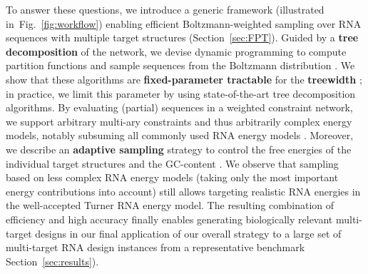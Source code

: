 \documentclass{bioinfo}
\newcommand{\Def}[1]{{\bfseries #1}}
\newcommand{\Nuc}[1]{{\sf #1}}
\newcommand{\Cb}{\Nuc{C}}
\newcommand{\Gb}{\Nuc{G}}
\newcommand{\GCb}{\Gb\Cb}
\begin{document}
To answer these questions, we introduce a generic framework (illustrated in~Fig.~\ref{fig:workflow}) enabling efficient Boltzmann-weighted sampling over RNA sequences with multiple target structures (Section~\ref{sec:FPT}). Guided by a \Def{tree decomposition} of the network, we devise dynamic programming to compute partition functions and sample sequences from the Boltzmann distribution%
. We show that these algorithms are \Def{fixed-parameter tractable} for the \Def{treewidth}%
%
; in practice, we limit this parameter by using state-of-the-art tree decomposition algorithms.
By evaluating (partial) sequences in a weighted constraint
network, we support arbitrary multi-ary constraints and thus
arbitrarily complex energy models,
notably subsuming all commonly
used RNA energy models%
.  Moreover, we describe an \Def{adaptive
  sampling} strategy to control the free energies of the individual
target structures and the \GCb-content%
. %
We observe that sampling based on less complex RNA energy models
(taking only the most important energy contributions into account)
still allows targeting realistic RNA energies in the well-accepted
Turner RNA energy model. The resulting combination of efficiency and
high accuracy finally enables generating biologically relevant
multi-target designs in our final application of our overall strategy
to a large set of multi-target RNA design instances from a
representative benchmark Section~\ref{sec:results}).

\end{document}
